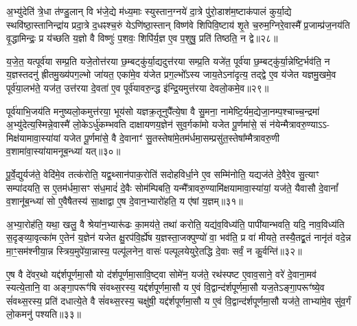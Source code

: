 अ॒भ्यु॑देति॑ त्रे॒धा त॑ण्डु॒लान् वि भ॑जे॒द्ये म॑ध्य॒माः स्युस्तान॒ग्नये॑ दा॒त्रे पु॑रो॒डाश॑म॒ष्टाक॑पालं कुर्या॒द्ये स्थवि॑ष्ठा॒स्तानिन्द्रा॑य प्रदा॒त्रे द॒धꣴश्च॒रुं ये\-ऽणि॑ष्ठा॒स्तान् विष्ण॑वे शिपिवि॒ष्टाय॑ शृ॒ते च॒रुम॒ग्निरे॒वास्मै᳚ प्र॒जाम्प्र॑ज॒नय॑ति वृ॒द्धामिन्द्रः॒ प्र य॑च्छति य॒ज्ञो वै विष्णुः॑ प॒शवः॒ शिपि॑र्य॒ज्ञ ए॒व प॒शुषु॒ प्रति॑ तिष्ठति॒ न द्वे॥२८॥

य॒जे॒त॒ यत्पूर्व॑या सम्प्र॒ति यजे॒तोत्त॑रया छ॒म्बट्कु॑र्या॒द्यदुत्त॑रया सम्प्र॒ति यजे॑त॒ पूर्व॑या छ॒म्बट्कु॑र्या॒न्नेष्टि॒र्भव॑ति॒ न य॒ज्ञस्तदनु॑ ह्रीतमु॒ख्य॑पग॒ल्भो जा॑यत॒ एका॑मे॒व य॑जेत प्रग॒ल्भो᳚\-ऽस्य जाय॒ते\-ऽना॑दृत्य॒ तद्द्वे ए॒व य॑जेत यज्ञमु॒खमे॒व पूर्व॑या॒लभ॑ते॒ यज॑त॒ उत्त॑रया दे॒वता॑ ए॒व पूर्व॑यावरु॒न्द्ध इ॑न्द्रि॒यमुत्त॑रया देवलो॒कमे॒व॥२९॥

पूर्व॑याभि॒जय॑ति मनुष्यलो॒कमुत्त॑रया॒ भूय॑सो यज्ञक्र॒तूनुपै᳚त्ये॒षा वै सु॒मना॒ नामेष्टि॒र्यम॒द्येजा॒नम्प॒श्चाच्च॒न्द्रमा॑ अ॒भ्यु॑देत्य॒स्मिन्ने॒वास्मै॑ लो॒के\-ऽर्धु॑कम्भवति दाक्षायणय॒ज्ञेन॑ सुव॒र्गका॑मो यजेत पू॒र्णमा॑से॒ सं न॑येन्मैत्रावरु॒ण्या\-ऽ\-ऽ- मिक्ष॑यामावा॒स्या॑यां यजेत पू॒र्णमा॑से॒ वै दे॒वानाꣳ॑ सु॒तस्तेषा॑मे॒तम॑र्धमा॒सम्प्रसु॑त॒स्तेषा᳚म्मैत्रावरु॒णी व॒शामा॑वा॒स्या॑यामनूब॒न्ध्या॑ यत्॥३०॥

पू॒र्वे॒द्युर्यज॑ते॒ वेदि॑मे॒व तत्क॑रोति॒ यद्व॒थ्सान॑पाक॒रोति॑ सदोहविर्धा॒ने ए॒व सम्मि॑नोति॒ यद्यज॑ते दे॒वैरे॒व सु॒त्याꣳ सम्पा॑दयति॒ स ए॒तम॑र्धमा॒सꣳ स॑ध॒मादं॑ दे॒वैः सोम॑म्पिबति॒ यन्मै᳚त्रावरु॒ण्यामि॑क्षयामावा॒स्या॑यां॒ यज॑ते॒ यैवासौ दे॒वानां᳚ व॒शानू॑ब॒न्ध्या॑ सो ए॒वैषैतस्य॑ सा॒क्षाद्वा ए॒ष दे॒वान॒भ्यारो॑हति॒ य ए॑षां य॒ज्ञम्॥३१॥

अ॒भ्या॒रोह॑ति॒ यथा॒ खलु॒ वै श्रेया॑न॒भ्यारू॑ढः का॒मय॑ते॒ तथा॑ करोति॒ यद्य॑व॒विध्य॑ति॒ पापी॑यान्भवति॒ यदि॒ नाव॒विध्य॑ति स॒दृङ्व्या॒वृत्का॑म ए॒तेन॑ य॒ज्ञेन॑ यजेत क्षु॒रप॑वि॒र्\mbox{}ह्ये॑ष य॒ज्ञस्ता॒जक्पुण्यो॑ वा॒ भव॑ति॒ प्र वा॑ मीयते॒ तस्यै॒तद्व्र॒तं नानृ॑तं वदे॒न्न मा॒ꣳ॒सम॑श्नीया॒न्न स्त्रिय॒मुपे॑या॒न्नास्य॒ पल्पू॑लनेन॒ वासः॑ पल्पूलयेयुरे॒तद्धि दे॒वाः सर्वं॒ न कु॒र्वन्ति॑॥३२॥

{\anuvakamend[{च॒न्द्रमा॒ द्वे दे॑वलो॒कमे॒व यद्य॒ज्ञं प॑ल्पूलयेयु॒ष्षट्च॑॥५॥}]}

ए॒ष वै दे॑वर॒थो यद्द॑र्\mbox{}शपूर्णमा॒सौ यो द॑र्\mbox{}शपूर्णमा॒सावि॒ष्ट्वा सोमे॑न॒ यज॑ते॒ रथ॑स्पष्ट ए॒वाव॒साने॒ वरे॑ दे॒वाना॒मव॑ स्यत्ये॒तानि॒ वा अङ्गा॒परूꣳ॑षि संवथ्स॒रस्य॒ यद्द॑र्\mbox{}शपूर्णमा॒सौ य ए॒वं वि॒द्वान्द॑र्\mbox{}शपूर्णमा॒सौ यज॒ते\-ऽङ्गा॒परूꣳ॑ष्ये॒व सं॑वथ्स॒रस्य॒ प्रति॑ दधात्ये॒ते वै सं॑वथ्स॒रस्य॒ चक्षु॑षी॒ यद्द॑र्\mbox{}शपूर्णमा॒सौ य ए॒वं वि॒द्वान्द॑र्\mbox{}शपूर्णमा॒सौ यज॑ते॒ ताभ्या॑मे॒व सु॑व॒र्गं लो॒कमनु॑ पश्यति॥३३॥

